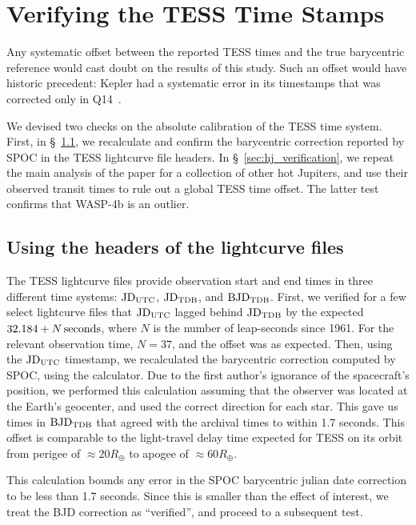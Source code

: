 \documentclass[12pt,twocolumn,tighten]{aastex62}
\begin{document}
\appendix

\section{Verifying the TESS Time Stamps}
\label{sec:verify_tess}

Any systematic offset between the reported TESS
times and the true barycentric reference would cast doubt on the
results of this study.  Such an offset would have historic precedent:
Kepler had a systematic error in its timestamps that was corrected
only in Q14~\citep[][Section 3.4]{kepler_DR19_2013}.

We devised two checks on the absolute calibration of the TESS time
system.  First, in \S~\ref{sec:headers}, we recalculate and confirm
the barycentric correction reported by SPOC in the TESS lightcurve
file headers.  In \S~\ref{sec:hj_verification}, we repeat the main
analysis of the paper for a collection of other hot Jupiters, and use
their observed transit times to rule out a global TESS time offset.
The latter test confirms that WASP-4b is an outlier.

\subsection{Using the headers of the lightcurve files}
\label{sec:headers}

The TESS lightcurve files provide observation start and end times in
three different time systems: ${\rm JD}_{\rm UTC}$, ${\rm JD}_{\rm
TDB}$, and ${\rm BJD}_{\rm TDB}$.
First, we verified for a few select lightcurve files that ${\rm
JD}_{\rm UTC}$ lagged behind ${\rm JD}_{\rm TDB}$ by the expected
$32.184 + N\,{\rm seconds}$, where $N$ is the number of leap-seconds
since 1961. For the relevant observation time, $N=37$, and the offset
was as expected.
Then, using the ${\rm JD}_{\rm UTC}$ timestamp, we recalculated the
barycentric correction computed by SPOC, using the
\citealt{eastman_achieving_2010} calculator.  Due to the first
author's ignorance of the spacecraft's position, we performed this
calculation assuming that the observer was located at the Earth's
geocenter, and used the correct direction for each star.  This gave us
times in ${\rm BJD}_{\rm TDB}$ that agreed with the archival times to
within 1.7 seconds.  This offset is comparable to the light-travel
delay time expected for TESS on its orbit from perigee of $\approx
20R_\oplus$ to apogee of $\approx 60R_\oplus$.

This calculation bounds any error in the SPOC barycentric julian date
correction to be less than 1.7 seconds.  Since this is smaller than
the effect of interest, we treat the BJD correction as ``verified'',
and proceed to a subsequent test.
\end{document}
